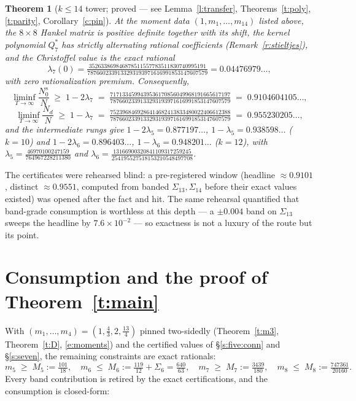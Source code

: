\documentclass[11pt]{article}
\numberwithin{equation}{section}
\newtheorem{theorem}{Theorem}[section]
\theoremstyle{definition}
\theoremstyle{remark}
\begin{document}
\begin{theorem}[$k\le14$ tower; proved --- see
Lemma~\ref{l:transfer}, Theorems~\ref{t:poly},
\ref{t:parity}, Corollary~\ref{c:pin}]\label{t:k14}
At the moment data $(1,m_1,\dots,m_{14})$ listed above, the
$8\times8$ Hankel matrix is positive definite together with
its shift, the kernel polynomial $Q_7^{*}$ has strictly
alternating rational coefficients
(Remark~\ref{r:stieltjes}), and the Christoffel value is the
exact rational
\[
\lambda_7(0)=
\tfrac{352633869846878511557783511830740995191}{7876602339133293193971616991853147607579}
=0.04476979\ldots,
\]
with zero rationalization premium. Consequently,
\[
\liminf_{T\to\infty}\frac{N_0^{s}}{N}\;\ge\;1-2\lambda_7
\;=\;
\tfrac{7171334599439536170856049968191665617197}{7876602339133293193971616991853147607579}
\;=\;0.9104604105\ldots,
\]
\[
\liminf_{T\to\infty}\frac{N_d}{N}\;\ge\;1-\lambda_7
\;=\;
\tfrac{7523968469286414682413833480022406612388}{7876602339133293193971616991853147607579}
\;=\;0.955230205\ldots,
\]
and the intermediate rungs give
$1-2\lambda_5=0.877197\ldots$, $1-\lambda_5=0.938598\ldots$
($k=10$) and $1-2\lambda_6=0.896403\ldots$,
$1-\lambda_6=0.948201\ldots$ ($k=12$), with
$\lambda_5=\tfrac{46970100247159}{764967228211380}$ and
$\lambda_6=
\tfrac{13166900320841109317259245}{254195527518153210548497708}$.
\end{theorem}

The certificates were rehearsed blind: a pre-registered window
(headline $\approx0.9101$, distinct $\approx0.9551$, computed
from banded $\Sigma_{13},\Sigma_{14}$ before their exact
values existed) was opened after the fact and hit. The same
rehearsal quantified that band-grade consumption is worthless
at this depth --- a $\pm0.004$ band on $\Sigma_{13}$ sweeps
the headline by $7.6\times10^{-2}$ --- so exactness is not a
luxury of the route but its point.

\section{Consumption and the proof of
Theorem~\ref{t:main}}\label{s:lp}

With $(m_1,\dots,m_4)=(1,\tfrac43,2,\tfrac{13}4)$ pinned
two-sidedly (Theorem~\ref{t:m3}, Theorem~\ref{t:D},
\eqref{e:moments}) and the certified values of
\S\ref{s:five:conn} and \S\ref{s:seven}, the remaining
constraints are exact rationals:
\[
m_5\;\ge\;M_5:=\tfrac{101}{18},
\quad
m_6\;\le\;M_6:=\tfrac{119}{12}+\Sigma_6=\tfrac{640}{63},
\quad
m_7\;\ge\;M_7:=\tfrac{3439}{180},
\quad
m_8\;\le\;M_8:=\tfrac{747361}{20160}.
\]
Every band contribution is retired by the exact
certifications, and the consumption is closed-form:
\end{document}
